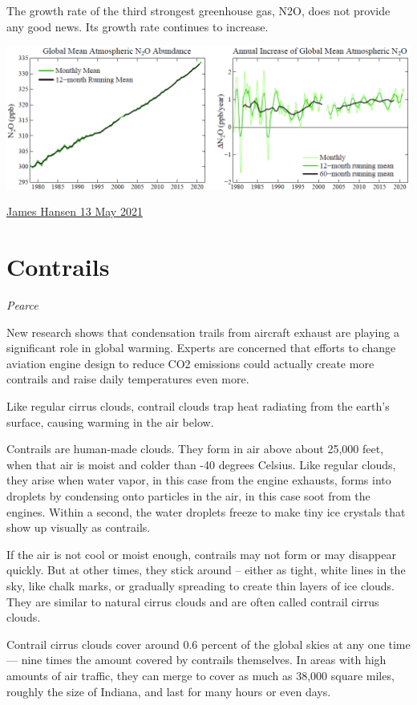 \documentclass[
]{book}
\begin{document}
The growth rate of the third strongest greenhouse gas, N2O, does not provide any good news. Its growth rate continues to increase.

\includegraphics{fig/N2O_Abundance.png}

\href{https://mailchi.mp/caa/the-world-has-cooled-off-whats-the-significance}{James Hansen 13 May 2021}

\hypertarget{contrails}{%
\section{Contrails}\label{contrails}}

\emph{Pearce}

New research shows that condensation trails from aircraft exhaust are playing a significant role in global warming. Experts are concerned that efforts to change aviation engine design to reduce CO2 emissions could actually create more contrails and raise daily temperatures even more.

Like regular cirrus clouds, contrail clouds trap heat radiating from the earth's surface, causing warming in the air below.

Contrails are human-made clouds. They form in air above about 25,000 feet, when that air is moist and colder than -40 degrees Celsius. Like regular clouds, they arise when water vapor, in this case from the engine exhausts, forms into droplets by condensing onto particles in the air, in this case soot from the engines. Within a second, the water droplets freeze to make tiny ice crystals that show up visually as contrails.

If the air is not cool or moist enough, contrails may not form or may disappear quickly. But at other times, they stick around -- either as tight, white lines in the sky, like chalk marks, or gradually spreading to create thin layers of ice clouds. They are similar to natural cirrus clouds and are often called contrail cirrus clouds.

Contrail cirrus clouds cover around 0.6 percent of the global skies at any one time --- nine times the amount covered by contrails themselves. In areas with high amounts of air traffic, they can merge to cover as much as 38,000 square miles, roughly the size of Indiana, and last for many hours or even days.
\end{document}
